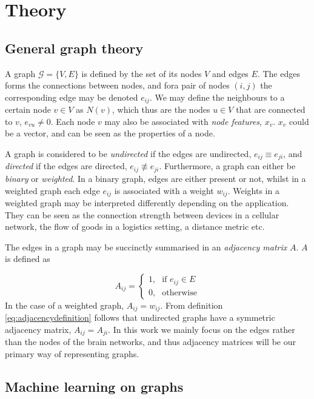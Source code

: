 \chapter{Theory}

\section{General graph theory}

A graph $\mathcal{G} = \{V, E \} $ is defined by the set of its nodes $V$ and edges $E$. The edges forms the connections between nodes, and fora pair of nodes $(i,j)$ the corresponding edge may be denoted $e_{ij}$. We may define the neighbours to a certain node $v \in V$ as $N(v)$, which thus are the nodes $u \in V$ that are connected to $v$, $e_{vu} \neq 0$. Each node $v$ may also be associated with \textit{node features}, $x_v$. $x_v$ could be a vector, and can be seen as the properties of a node.

A graph is considered to be \textit{undirected} if the edges are undirected, $e_{ij} \equiv e_{ji}$, and \textit{directed} if the edges are directed, $e_{ij} \not\equiv e_{ji}$. Furthermore, a graph can either be \textit{binary} or \textit{weighted}. In a binary graph, edges are either present or not, whilst in a weighted graph each edge $e_{ij}$ is associated with a weight $w_{ij}$. \cite{source} Weights in a weighted graph may be interpreted differently depending on the application. They can be seen as the connection strength between devices in a cellular network, the flow of goods in a logistics setting, a distance metric etc.

The edges in a graph may be succinctly summarised in an \textit{adjacency matrix} $A$. $A$ is defined as

\begin{equation}
    A_{ij} = \begin{cases} \mbox{1,} & \mbox{if } e_{ij} \in E \\ \mbox{0,} & \mbox{otherwise} \end{cases}
    \label{eq:adjacencydefinition}
\end{equation}
In the case of a weighted graph, $A_{ij} = w_{ij}$. From definition \eqref{eq:adjacencydefinition} follows that undirected graphs have a symmetric adjacency matrix, $A_{ij} = A_{ji}$. In this work we mainly focus on the edges rather than the nodes of the brain networks, and thus adjacency matrices will be our primary way of representing graphs.

\section{Machine learning on graphs}

